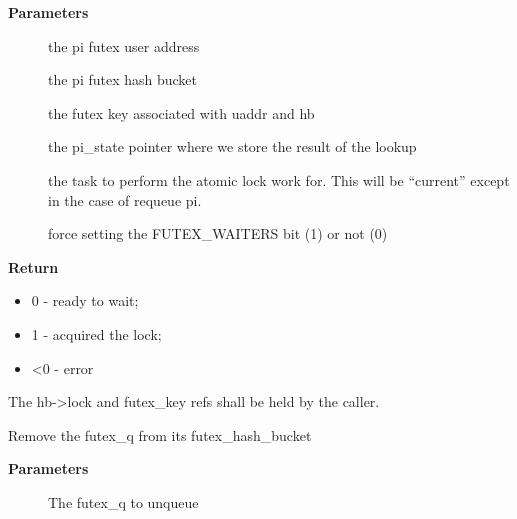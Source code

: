\documentclass[a4paper,8pt,english]{sphinxmanual}
\begin{document}
\textbf{Parameters}
\begin{description}
\item[{}] \leavevmode
the pi futex user address

\item[{}] \leavevmode
the pi futex hash bucket

\item[{}] \leavevmode
the futex key associated with uaddr and hb

\item[{}] \leavevmode
the pi\_state pointer where we store the result of the
lookup

\item[{}] \leavevmode
the task to perform the atomic lock work for.  This will
be ``current'' except in the case of requeue pi.

\item[{}] \leavevmode
force setting the FUTEX\_WAITERS bit (1) or not (0)

\end{description}

\textbf{Return}
\begin{itemize}
\item {} 
0 - ready to wait;

\item {} 
1 - acquired the lock;

\item {} 
\textless{}0 - error

\end{itemize}

The hb-\textgreater{}lock and futex\_key refs shall be held by the caller.

\begin{fulllineitems}
\label{kernel-hacking/locking:c.__unqueue_futex}
Remove the futex\_q from its futex\_hash\_bucket

\end{fulllineitems}


\textbf{Parameters}
\begin{description}
\item[{}] \leavevmode
The futex\_q to unqueue

\end{description}
\end{document}
